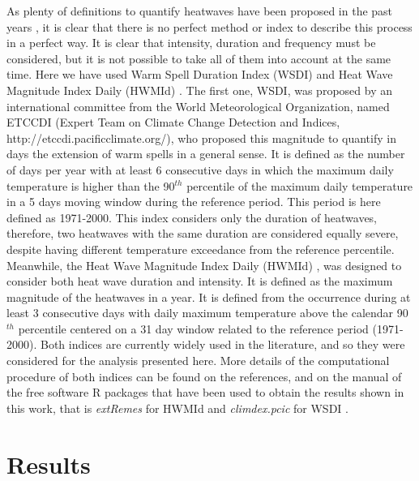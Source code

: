 As plenty of definitions to quantify heatwaves have been proposed
in the past years \cite{zha_al2011,per2015,ouz_al2016}, it is clear
that there is no perfect method or index to describe this process in a
perfect way. It is clear that intensity, duration and frequency must
be considered, but it is not possible to take all of them into account
at the same time. Here we have used Warm Spell Duration Index (WSDI) \cite{zha_al2011}
and Heat Wave Magnitude Index Daily (HWMId) \cite{rus_al2015}.
The first one, WSDI, was proposed by an international committee from the
World Meteorological Organization, named ETCCDI (Expert Team on Climate Change 
Detection and Indices, http://etccdi.pacificclimate.org/), who proposed
this magnitude to quantify in days the extension of warm spells in a general sense.
It is defined as the number of days per year with at least 6 consecutive days 
in which the maximum daily temperature is higher than the 90$^{th}$ percentile of the 
maximum daily temperature in a 5 days moving window during the reference period. 
This period is here defined as 1971-2000. This index considers only the duration 
of heatwaves, therefore, two heatwaves with the same duration are considered equally 
severe, despite having different temperature exceedance from the reference percentile.
Meanwhile, the Heat Wave Magnitude Index Daily (HWMId) \cite{rus_al2014,rus_al2015,dos_al2018}, was designed
to consider both heat wave duration and intensity. It is defined as the maximum magnitude of the heatwaves in a year. It is defined from the occurrence during
at least 3 consecutive days with daily maximum temperature above the calendar 90$^{th}$
percentile centered on a 31 day window related to the reference period (1971-2000).
Both indices are currently widely used in the literature, and so they were considered
for the analysis presented here. More details of the computational procedure of
both indices can be found on the references, and on the manual of the free
software R packages that have been used to obtain the results shown in
this work, that is {\it extRemes} \cite{ext2016} for HWMId and {\it climdex.pcic}
for WSDI \cite{cli2018}.

\section{Results}

